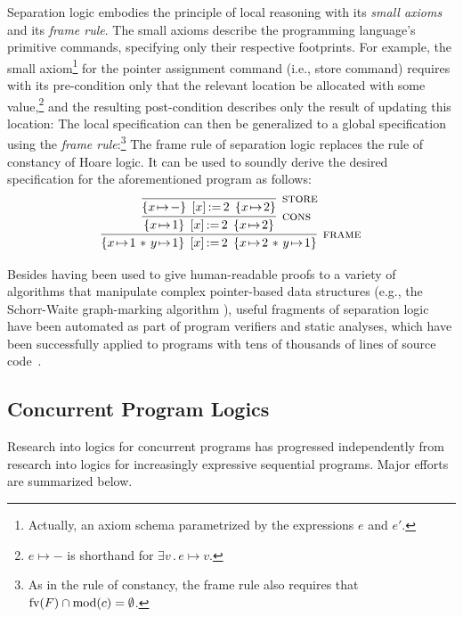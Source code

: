 \documentclass[11pt]{report}         %
\begin{document}
Separation logic embodies the principle of local reasoning with its \emph{small axioms} and its \emph{frame rule}. The small axioms describe the programming language's primitive commands, specifying only their respective footprints. For example, the small axiom\footnote{Actually, an axiom schema parametrized by the expressions $e$ and $e'$.} for the pointer assignment command (i.e., store command) requires with its pre-condition only that the relevant location be allocated with some value,\footnote{$e \mapsto -$ is shorthand for $\exists v\,.\,e \mapsto v$.} and the resulting post-condition describes only the result of updating this location:  The local specification can then be generalized to a global specification using the \emph{frame rule}:\footnote{As in the rule of constancy, the frame rule also requires that $\mathrm{fv}(F) \cap \mathrm{mod}(c) = \operatorname{\emptyset}$.}   The frame rule of separation logic replaces the rule of constancy of Hoare logic. It can be used to soundly derive the desired specification for the aforementioned program as follows: \[ \infer[\textsc{frame}]{\htriple{x \fpointsto 1 \fsep y \fpointsto 1}{\cstore{x}{2}}{x \fpointsto 2 \fsep y \fpointsto 1}}{\infer[\textsc{cons}]{\htriple{x \fpointsto 1}{\cstore{x}{2}}{x \fpointsto 2}}{\infer[\textsc{store}]{\htriple{x \fpointsto - }{\cstore{x}{2}}{x \fpointsto 2}}{}}}\]

Besides having been used to give human-readable proofs to a variety of algorithms that manipulate complex pointer-based data structures (e.g., the Schorr-Waite graph-marking algorithm \cite{Yang-thesis}), useful fragments of separation logic have been automated as part of program verifiers and static analyses, which have been successfully applied to programs with tens of thousands of lines of source code~\cite{DBLP:conf/fmco/BerdineCO05,DBLP:conf/cav/YangLBCCDO08,DBLP:conf/cav/BerdineCI11}.

\subsection{Concurrent Program Logics}
\label{ch:concurrent-program-logics}

Research into logics for concurrent programs has progressed independently from research into logics for increasingly expressive sequential programs. Major efforts are summarized below. 
\end{document}
